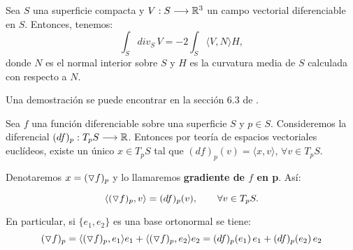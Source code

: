 \begin{theorem}\label{divergesurfaces}
Sea $S$ una superficie compacta y $V: S \longrightarrow \mathbb{R}^3$ un campo vectorial diferenciable en $S$. Entonces, tenemos:
%
\begin{equation*}
    \int_S div_S \, V = -2 \int_S \langle V,N \rangle H,
\end{equation*}
%
donde $N$ es el normal interior sobre $S$ y $H$ es la curvatura media de $S$ calculada con respecto a $N$.
\end{theorem}

Una demostración se puede encontrar en la sección 6.3 de \cite{montielrosbook}.

\begin{definition}[Gradiente]
Sea $f$ una función diferenciable sobre una superficie $S$ y $p \in S$. Consideremos la diferencial $(df)_p: T_pS \longrightarrow \mathbb{R}$. Entonces por teoría de espacios vectoriales euclídeos, existe un único $x \in T_pS$ tal que $(df)_p(v)=  \langle x,v \rangle $, $\forall v \in T_pS$.

Denotaremos $x= (\triangledown f)_p $ y lo llamaremos \textbf{gradiente de $f$ en p}. Así:

\begin{equation*}
    \langle (\triangledown f)_p, v \rangle = (df)_p(v), \qquad \forall v \in T_pS.
\end{equation*}

En particular, si $\{e_1, e_2\}$ es una base ortonormal se tiene:
%
\begin{equation*}
     (\triangledown f)_p = \langle  (\triangledown f)_p , e_1 \rangle e_1 + \langle (\triangledown f)_p, e_2 \rangle e_2 = (df)_p(e_1) \, e_1 + (df)_p(e_2) \, e_2
\end{equation*}
\end{definition}

